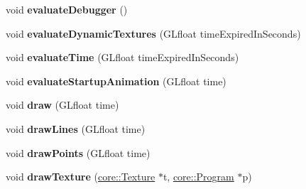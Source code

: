 \begin{DoxyCompactItemize}
\item 
\hypertarget{structfillwave_1_1Engine_1_1EngineImpl_aa5696e94c61d393ce2e32c7a048766ae}{}void {\bfseries evaluate\+Debugger} ()\label{structfillwave_1_1Engine_1_1EngineImpl_aa5696e94c61d393ce2e32c7a048766ae}

\item 
\hypertarget{structfillwave_1_1Engine_1_1EngineImpl_afefed0cc80ec702b0a1c3bfeebe8fd77}{}void {\bfseries evaluate\+Dynamic\+Textures} (G\+Lfloat time\+Expired\+In\+Seconds)\label{structfillwave_1_1Engine_1_1EngineImpl_afefed0cc80ec702b0a1c3bfeebe8fd77}

\item 
\hypertarget{structfillwave_1_1Engine_1_1EngineImpl_a722669bb4811a36694509ac06d8226f9}{}void {\bfseries evaluate\+Time} (G\+Lfloat time\+Expired\+In\+Seconds)\label{structfillwave_1_1Engine_1_1EngineImpl_a722669bb4811a36694509ac06d8226f9}

\item 
\hypertarget{structfillwave_1_1Engine_1_1EngineImpl_aa58cc946ce4337587824b6ea882bbe76}{}void {\bfseries evaluate\+Startup\+Animation} (G\+Lfloat time)\label{structfillwave_1_1Engine_1_1EngineImpl_aa58cc946ce4337587824b6ea882bbe76}

\item 
\hypertarget{structfillwave_1_1Engine_1_1EngineImpl_a82edf3e5ad93b78b9ed9756b30c3b49d}{}void {\bfseries draw} (G\+Lfloat time)\label{structfillwave_1_1Engine_1_1EngineImpl_a82edf3e5ad93b78b9ed9756b30c3b49d}

\item 
\hypertarget{structfillwave_1_1Engine_1_1EngineImpl_a69ced5fe8d88e68185a82a6e6c404006}{}void {\bfseries draw\+Lines} (G\+Lfloat time)\label{structfillwave_1_1Engine_1_1EngineImpl_a69ced5fe8d88e68185a82a6e6c404006}

\item 
\hypertarget{structfillwave_1_1Engine_1_1EngineImpl_a588293236606e4c021f538658e4def60}{}void {\bfseries draw\+Points} (G\+Lfloat time)\label{structfillwave_1_1Engine_1_1EngineImpl_a588293236606e4c021f538658e4def60}

\item 
\hypertarget{structfillwave_1_1Engine_1_1EngineImpl_abda6fbb942630c3eeaf2b4e1c63b77a1}{}void {\bfseries draw\+Texture} (\hyperlink{classfillwave_1_1core_1_1Texture}{core\+::\+Texture} $\ast$t, \hyperlink{classfillwave_1_1core_1_1Program}{core\+::\+Program} $\ast$p)\label{structfillwave_1_1Engine_1_1EngineImpl_abda6fbb942630c3eeaf2b4e1c63b77a1}


\end{DoxyCompactItemize}
